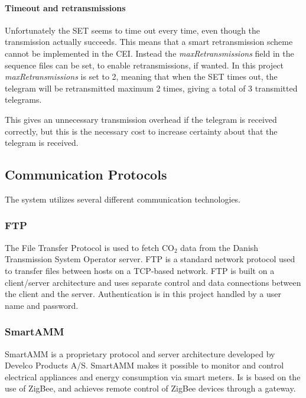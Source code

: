 \documentclass[Main]{subfiles}
\begin{document}
			\paragraph{Timeout and retransmissions} %
			\label{par:timeout_and_retransmissions}
				Unfortunately the SET seems to time out every time, even though the transmission actually succeeds.
				This means that a smart retransmission scheme cannot be implemented in the CEI. 
				Instead the \emph{maxRetransmissions} field in the sequence files can be set, to enable retransmissions, if wanted. 
				In this project \emph{maxRetransmissions} is set to 2, meaning that when the SET times out, the telegram will be retransmitted maximum 2 times, giving a total of 3 transmitted telegrams.

				This gives an unnecessary transmission overhead if the telegram is received correctly, but this is the necessary cost to increase certainty about that the telegram is received.

	\subsection{Communication Protocols}
		The system utilizes several different communication technologies.

		\subsubsection{FTP}
			The File Transfer Protocol is used to fetch CO$_2$ data from the Danish Transmission System Operator server.
			FTP is a standard network protocol used to transfer files between hosts on a TCP-based network\cite{FTPWikipedia:Online}.
			FTP is built on a client/server architecture and uses separate control and data connections between the client and the server\cite{TCPIPProtocol}.
			Authentication is in this project handled by a user name and password.  


		\subsubsection{SmartAMM}
			SmartAMM is a proprietary protocol and server architecture developed by Develco Products A/S. 
			SmartAMM makes it possible to monitor and control electrical appliances and energy consumption via smart meters.
			Is is based on the use of ZigBee, and achieves remote control of ZigBee devices through a gateway\cite{SmartAMM:Online}.
\end{document}
